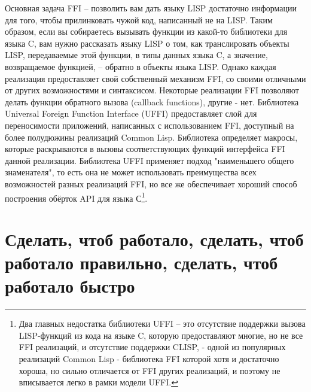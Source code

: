 Основная задача FFI -- позволить вам дать языку LISP достаточно информации для того, чтобы
прилинковать чужой код, написанный не на LISP. Таким образом, если вы собираетесь вызывать
функции из какой-то библиотеки для языка C, вам нужно рассказать языку LISP о том, как
транслировать объекты LISP, передаваемые этой функции, в типы данных языка C, а значение,
возвращаемое функцией, -- обратно в объекты языка LISP. Однако каждая реализация
предоставляет свой собственный механизм FFI, со своими отличными от других возможностями и
синтаксисом. Некоторые реализации FFI позволяют делать функции обратного вызова (callback
functions), другие - нет. Библиотека Universal Foreign Function Interface (UFFI)
предоставляет слой для переносимости приложений, написанных с использованием FFI,
доступный на более полудюжины реализаций Common Lisp. Библиотека определяет макросы,
которые раскрываются в вызовы соответствующих функций интерфейса FFI данной
реализации. Библиотека UFFI применяет подход "наименьшего общего знаменателя", то есть она
не может использовать преимущества всех возможностей разных реализаций FFI, но все же
обеспечивает хороший способ построения обёрток API для языка С\footnote{Два главных
  недостатка библиотеки UFFI -- это отсутствие поддержки вызова LISP-функций из кода на
  языке C, которую предоставляют многие, но не все FFI реализаций, и отсутствие поддержки
  CLISP, - одной из популярных реализаций Common Lisp - библиотека FFI которой хотя и
  достаточно хороша, но сильно отличается от FFI других реализаций, и поэтому не
  вписывается легко в рамки модели UFFI.}.

\section{Сделать, чтоб работало, сделать, чтоб работало правильно, сделать, чтоб работало быстро}

